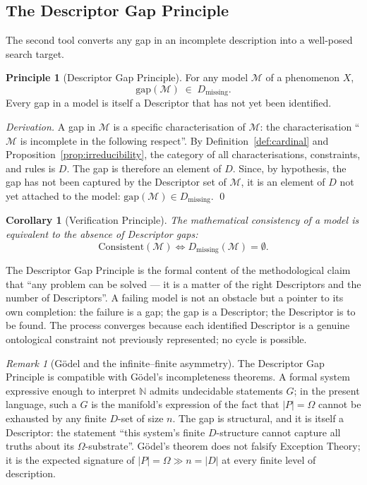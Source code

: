 \documentclass[11pt,a4paper]{article}
\newtheorem{corollary}[theorem]{Corollary}
\theoremstyle{definition}
\newtheorem{principle}[theorem]{Principle}
\theoremstyle{remark}
\newtheorem{remark}[theorem]{Remark}
\begin{document}
\subsection{The Descriptor Gap Principle}\label{subsec:descriptor-gap}

The second tool converts any gap in an incomplete description into a well-posed search target.

\begin{principle}[Descriptor Gap Principle]\label{princ:descriptor-gap}
For any model $\mathcal{M}$ of a phenomenon $X$,
\[
\boxed{\;\mathrm{gap}(\mathcal{M}) \;\in\; D_{\mathrm{missing}}.\;}
\]
Every gap in a model is itself a Descriptor that has not yet been identified.
\end{principle}

\begin{proof}[Derivation]
A gap in $\mathcal{M}$ is a specific characterisation of $\mathcal{M}$: the characterisation ``$\mathcal{M}$ is incomplete in the following respect''. By Definition~\ref{def:cardinal} and Proposition~\ref{prop:irreducibility}, the category of all characterisations, constraints, and rules is $D$. The gap is therefore an element of $D$. Since, by hypothesis, the gap has not been captured by the Descriptor set of $\mathcal{M}$, it is an element of $D$ not yet attached to the model: $\mathrm{gap}(\mathcal{M})\in D_{\mathrm{missing}}$. \qed
\end{proof}

\begin{corollary}[Verification Principle]\label{cor:verification}
The mathematical consistency of a model is equivalent to the absence of Descriptor gaps:
\[
\mathrm{Consistent}(\mathcal{M}) \iff D_{\mathrm{missing}}(\mathcal{M}) = \emptyset.
\]
\end{corollary}

The Descriptor Gap Principle is the formal content of the methodological claim that ``any problem can be solved --- it is a matter of the right Descriptors and the number of Descriptors''. A failing model is not an obstacle but a pointer to its own completion: the failure is a gap; the gap is a Descriptor; the Descriptor is to be found. The process converges because each identified Descriptor is a genuine ontological constraint not previously represented; no cycle is possible.

\begin{remark}[Gödel and the infinite--finite asymmetry]
The Descriptor Gap Principle is compatible with Gödel's incompleteness theorems. A formal system expressive enough to interpret $\mathbb{N}$ admits undecidable statements $G$; in the present language, such a $G$ is the manifold's expression of the fact that $|P|=\Omega$ cannot be exhausted by any finite $D$-set of size $n$. The gap is structural, and it is itself a Descriptor: the statement ``this system's finite $D$-structure cannot capture all truths about its $\Omega$-substrate''. Gödel's theorem does not falsify Exception Theory; it is the expected signature of $|P|=\Omega \gg n = |D|$ at every finite level of description.
\end{remark}
\end{document}
